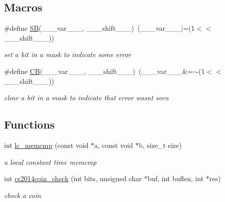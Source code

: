 \subsection*{Macros}
\begin{DoxyCompactItemize}
\item 
\mbox{\label{cs2014coin-check_8c_ae24a8f3306fdaad53c6ac0fd494e3d5c}} 
\#define \hyperlink{cs2014coin-check_8c_ae24a8f3306fdaad53c6ac0fd494e3d5c}{SB}(\+\_\+\+\_\+\+\_\+var\+\_\+\+\_\+\+\_\+,  \+\_\+\+\_\+\+\_\+shift\+\_\+\+\_\+\+\_\+)~(\+\_\+\+\_\+\+\_\+var\+\_\+\+\_\+\+\_\+$\vert$=(1$<$$<$\+\_\+\+\_\+\+\_\+shift\+\_\+\+\_\+\+\_\+))
\begin{DoxyCompactList}\small\item\em set a bit in a mask to indicate some error \end{DoxyCompactList}\item 
\mbox{\label{cs2014coin-check_8c_a21155e3c6dc04da3b8c6f635e8bf79b8}} 
\#define \hyperlink{cs2014coin-check_8c_a21155e3c6dc04da3b8c6f635e8bf79b8}{CB}(\+\_\+\+\_\+\+\_\+var\+\_\+\+\_\+\+\_\+,  \+\_\+\+\_\+\+\_\+shift\+\_\+\+\_\+\+\_\+)~(\+\_\+\+\_\+\+\_\+var\+\_\+\+\_\+\+\_\+\&=$\sim$(1$<$$<$\+\_\+\+\_\+\+\_\+shift\+\_\+\+\_\+\+\_\+))
\begin{DoxyCompactList}\small\item\em clear a bit in a mask to indicate that error wasn\textquotesingle{}t seen \end{DoxyCompactList}\end{DoxyCompactItemize}
\subsection*{Functions}
\begin{DoxyCompactItemize}
\item 
int \hyperlink{cs2014coin-check_8c_a14bef37cd5f67358cd43ce1308049667}{lc\+\_\+memcmp} (const void $\ast$a, const void $\ast$b, size\+\_\+t size)
\begin{DoxyCompactList}\small\item\em a local constant time memcmp \end{DoxyCompactList}\item 
int \hyperlink{cs2014coin-check_8c_ae7d692031170a392c66b9810c65a79a3}{cs2014coin\+\_\+check} (int bits, unsigned char $\ast$buf, int buflen, int $\ast$res)
\begin{DoxyCompactList}\small\item\em check a coin \end{DoxyCompactList}\end{DoxyCompactItemize}


